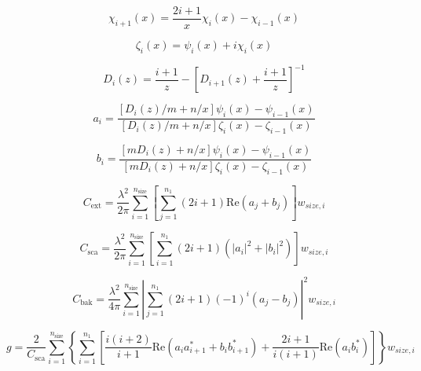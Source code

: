 \documentclass[letterpaper, 11pt]{article}
\begin{document}
\begin{equation}
\chi_{i+1}(x) = \frac{2i + 1}{x}\chi_{i}(x) - \chi_{i-1}(x)
\label{eq:lmie_core_chi_i}
\end{equation}

\begin{equation}
\zeta_{i}(x) = \psi_{i}(x) + i \chi_{i}(x)
\label{eq:lmie_core_zeta_i}
\end{equation}

\begin{equation}
D_{i}(z) = \frac{i + 1}{z} - \left[D_{i + 1}(z) + \frac{i + 1}{z}\right]^{-1}
\label{eq:lmie_core_d_i}
\end{equation}

\begin{equation}
a_{i} = \frac{\left[D_{i}(z)/m + n / x\right]\psi_{i}(x) - \psi_{i-1}(x)}{\left[D_{i}(z)/m + n / x\right]\zeta_{i}(x) - \zeta_{i-1}(x)}
\label{eq:lmie_core_a_i}
\end{equation}

\begin{equation}
b_{i} = \frac{\left[m D_{i}(z) + n / x\right]\psi_{i}(x) - \psi_{i-1}(x)}{\left[m D_{i}(z) + n / x\right]\zeta_{i}(x) - \zeta_{i-1}(x)}
\label{eq:lmie_core_b_i}
\end{equation}

\begin{equation}
C_{\mathrm{ext}} = \frac{\lambda^{2}}{2\pi} \sum^{n_{\mathrm{size}}}_{i = 1} \left[\sum^{n_{1}}_{j = 1} (2i + 1) \mathrm{Re}(a_{j} + b_{j})\right] w_{size,i}
\label{eq:lmie_core_c_ext}
\end{equation}

\begin{equation}
C_{\mathrm{sca}} = \frac{\lambda^{2}}{2\pi} \sum^{n_{\mathrm{size}}}_{i = 1} \left[\sum^{n_{1}}_{i = 1} (2i + 1) (|a_{i}|^{2} + |b_{i}|^{2})\right] w_{size,i}
\label{eq:lmie_core_c_sca}
\end{equation}

\begin{equation}
C_{\mathrm{bak}} = \frac{\lambda^{2}}{4\pi} \sum^{n_{\mathrm{size}}}_{i = 1} \left|\sum^{n_{1}}_{j = 1} (2i + 1) (-1)^{i} (a_{j} - b_{j})\right|^{2} w_{size,i}
\label{eq:lmie_core_c_bak}
\end{equation}

\begin{equation}
g = \frac{2}{C_{\mathrm{sca}}} \sum^{n_{\mathrm{size}}}_{i = 1} \left\{\sum^{n_{1}}_{i = 1}\left[\frac{i(i + 2)}{i + 1} \mathrm{Re}(a_{i}a^{*}_{i+1} + b_{i}b^{*}_{i+1}) + \frac{2i + 1}{i(i + 1)} \mathrm{Re}(a_{i}b^{*}_{i})\right]\right\} w_{size,i}
\label{eq:lmie_core_g}
\end{equation}
\end{document}
